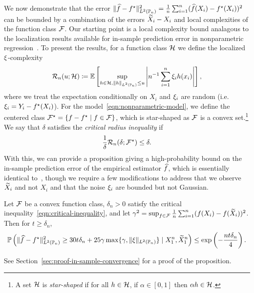 We now demonstrate that the error $\|{\widehat{f} - f^\star}\|_{L^2(\mathbb{P}_n)}^2 =
\frac{1}{n} \sum_{i = 1}^n (\widehat{f}(X_i) - f^\star(X_i))^2$ can be bounded by
a combination of the errors $\widetilde{X}_i - X_i$ and local complexities of the
function class $\mathcal{F}$.  Our starting point is a local complexity bound
analagous to the localization results available for in-sample prediction
error in nonparametric regression~\cite[cf.][Thm.~13.5]{Wainwright19}.  To
present the results, for a function class $\mathcal{H}$ we define the
localized $\xi$-complexity
\begin{equation*}
  \mathcal{R}_n(u; \mathcal{H})
  \coloneqq \mathbb{E}\left[ \sup_{h \in \mathcal{H},
      \|{h}\|_{L^2(\mathbb{P}_n)} \le u}
    \left|n^{-1} \sum_{i = 1}^n \xi_i h(x_i) \right| \right],
\end{equation*}
where we treat the expectation conditionally on $X_i$ and $\xi_i$ are
random (i.e.\ $\xi_i = Y_i - f^\star(X_i)$).  For the
model~\eqref{eqn:nonparametric-model}, we define the centered class
$\mathcal{F}^\star = \{f - f^\star \mid f \in \mathcal{F}\}$, which is star-shaped as
$\mathcal{F}$ is a convex set.\footnote{ A set $\mathcal{H}$ is \emph{star-shaped} if
  for all $h \in \mathcal{H}$, if $\alpha \in [0, 1]$ then $\alpha h \in
  \mathcal{H}$.}  We say that $\delta$ satisfies the \emph{critical radius
  inequality} if
\begin{equation}
  \frac{1}{\delta} \mathcal{R}_n(\delta; \mathcal{F}^\star)
  \le \delta.
  \label{eqn:critical-inequality}
\end{equation}
With this, we can provide a proposition giving a high-probability
bound on the in-sample prediction
error of the empirical estimator $\widehat{f}$, which is essentially
identical to~\cite[Thm.~13.5]{Wainwright19}, though we require a few
modifications to address that we observe $\widetilde{X}_i$ and not $X_i$
and that the noise $\xi_i$ are bounded but not Gaussian.
\begin{proposition}
  \label{proposition:in-sample-convergence}
  Let $\mathcal{F}$ be a convex function class, $\delta_n > 0$ satisfy the
  critical inequality~\eqref{eqn:critical-inequality},
  and let
  $\gamma^2 = \sup_{f \in \mathcal{F}}
  \frac{1}{n} \sum_{i = 1}^n (f(X_i) - f(\widetilde{X}_i))^2$.
  Then for $t \ge \delta_n$,
  \begin{equation*}
    \mathbb{P}\left(\|{\widehat{f} - f^\star}\|_{L^2(\mathbb{P}_n)}^2 \ge 30 t \delta_n
    + 25 \gamma \max\{\gamma, \|{\xi}\|_{L^2(\mathbb{P}_n)}\}
    \mid X_1^n, \widetilde{X}_1^n
    \right)
    \le \exp\left(-\frac{n t \delta_n}{4}\right).
  \end{equation*}
\end{proposition}
\noindent
See Section~\ref{sec:proof-in-sample-convergence} for a proof of the
proposition.

